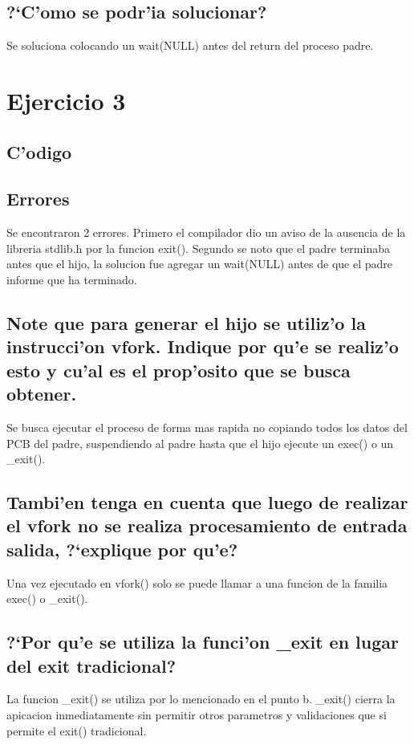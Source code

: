 \documentclass[a4paper,10pt]{article}
\newcommand{\?}{?`}
\begin{document}
\subsection[Punto C]{\?C'omo se podr'ia solucionar?}
Se soluciona colocando un wait(NULL) antes del return del proceso padre.

\section{Ejercicio 3}

\subsection{C'odigo}


\subsection{Errores}
Se encontraron 2 errores. Primero el compilador dio un aviso de la ausencia de la libreria stdlib.h por la funcion exit().
Segundo se noto que el padre terminaba antes que el hijo, la solucion fue agregar un wait(NULL) antes de que el padre informe que ha terminado.

\subsection[Punto A]{Note que para generar el hijo se utiliz'o la instrucci'on vfork. Indique por qu'e se realiz'o esto y cu'al es el prop'osito que se busca obtener.}
Se busca ejecutar el proceso de forma mas rapida no copiando todos los datos del PCB del padre, suspendiendo al padre hasta que el hijo ejecute un exec() o un \_exit().

\subsection[Punto B]{Tambi'en tenga en cuenta que luego de realizar el vfork no se realiza procesamiento de entrada salida, \?explique por qu'e?}
Una vez ejecutado en vfork() solo se puede llamar a una funcion de la familia exec() o \_exit().

\subsection[Punto C]{\?Por qu'e se utiliza la funci'on \_exit en lugar del exit tradicional?}
La funcion \_exit() se utiliza por lo mencionado en el punto b. \_exit() cierra la apicacion inmediatamente sin permitir otros parametros y validaciones que si permite el exit() tradicional.
\end{document}
